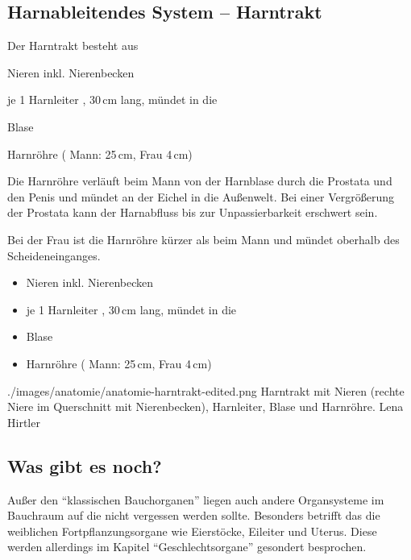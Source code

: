 \subsection{Harnableitendes System -- Harntrakt}

{
Der Harntrakt besteht aus 
\begin{inparaitem}
    \item Nieren inkl. Nierenbecken
    \item {}je 1 Harnleiter 
    , 30\,cm lang, mündet  in die 
    \item {}Blase 
    \item Harnröhre  ( Mann: 25\,cm, Frau
    4\,cm)
\end{inparaitem}

Die Harnröhre verläuft beim Mann von der Harnblase durch die
Prostata  und den Penis und
mündet an der Eichel in die Außenwelt. Bei einer Vergrößerung der Prostata
kann der Harnabfluss bis zur Unpassierbarkeit erschwert sein.  

Bei der Frau ist die Harnröhre kürzer als beim Mann und
mündet oberhalb des Scheideneinganges. 
}{
\begin{itemize}
    \item Nieren inkl. Nierenbecken
    \item {}je 1 Harnleiter 
    , 30\,cm lang, mündet  in die 
    \item {}Blase 
    \item Harnröhre  ( Mann: 25\,cm, Frau
    4\,cm)
\end{itemize}
}
{./images/anatomie/anatomie-harntrakt-edited.png}
{Harntrakt
mit Nieren (rechte Niere im Querschnitt mit Nierenbecken),
Harnleiter, Blase und Harnröhre. \label{fig:harntrakt}}
{Lena Hirtler}







\subsection{Was gibt es noch?}

Außer den "`klassischen Bauchorganen"' liegen auch andere
Organsysteme im Bauchraum auf die nicht vergessen werden
sollte. Besonders betrifft das die weiblichen
Fortpflanzungsorgane wie Eierstöcke, Eileiter und Uterus.
Diese werden allerdings im Kapitel "`Geschlechtsorgane"'
gesondert besprochen. 

